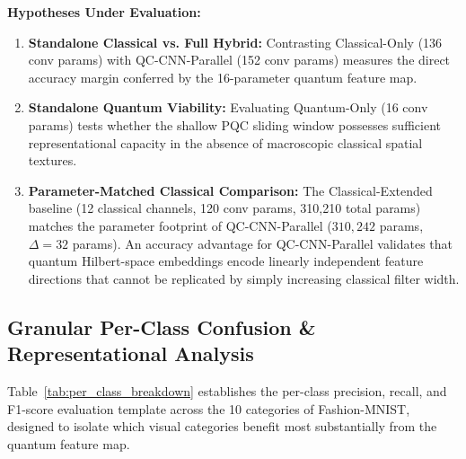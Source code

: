 \documentclass[journal]{IEEEtran}
\begin{document}
\textbf{Hypotheses Under Evaluation:}
\begin{enumerate}
    \item \textbf{Standalone Classical vs. Full Hybrid:} Contrasting Classical-Only (136 conv params) with QC-CNN-Parallel (152 conv params) measures the direct accuracy margin conferred by the 16-parameter quantum feature map.
    \item \textbf{Standalone Quantum Viability:} Evaluating Quantum-Only (16 conv params) tests whether the shallow PQC sliding window possesses sufficient representational capacity in the absence of macroscopic classical spatial textures.
    \item \textbf{Parameter-Matched Classical Comparison:} The Classical-Extended baseline (12 classical channels, 120 conv params, 310,210 total params) matches the parameter footprint of QC-CNN-Parallel ($310,242$ params, $\Delta = 32$ params). An accuracy advantage for QC-CNN-Parallel validates that quantum Hilbert-space embeddings encode linearly independent feature directions that cannot be replicated by simply increasing classical filter width.
\end{enumerate}

\begin{table}[!htbp]
\centering
\caption{Experiment 4: Multi-Branch Ablation Study Specifications and Benchmark Accuracies}
\label{tab:ablation_results}
\renewcommand{\arraystretch}{1.2}
\end{table}

\subsection{Granular Per-Class Confusion \& Representational Analysis}
Table~\ref{tab:per_class_breakdown} establishes the per-class precision, recall, and F1-score evaluation template across the 10 categories of Fashion-MNIST, designed to isolate which visual categories benefit most substantially from the quantum feature map.
\end{document}
